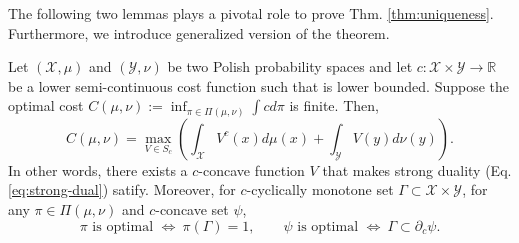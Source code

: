 The following two lemmas plays a pivotal role to prove Thm. \ref{thm:uniqueness}. Furthermore, we introduce generalized version of the theorem.
\begin{lemma} \label{lemma1}
Let $(\mathcal{X}, \mu)$ and $(\mathcal{Y}, \nu)$ be two Polish probability spaces and let $c:\mathcal{X}\times \mathcal{Y}\rightarrow \mathbb{R}$ be a lower semi-continuous cost function such that is lower bounded. Suppose the optimal cost $C(\mu, \nu) := \inf_{\pi \in \Pi(\mu, \nu)} \int c d\pi$ is finite. Then,
\begin{equation} \label{eq:strong-dual}
    C(\mu, \nu) = \max_{V\in S_c} \left( \int_{\mathcal{X}} V^c(x) d\mu(x) + \int_{\mathcal{Y}} V(y) d\nu(y) \right).
\end{equation}
In other words, there exists a $c$-concave function $V$ that makes strong duality (Eq. \ref{eq:strong-dual}) satify. Moreover, for $c$-cyclically monotone set $\Gamma \subset \mathcal{X}\times \mathcal{Y}$, for any $\pi\in \Pi(\mu, \nu)$ and $c$-concave set $\psi$,
\begin{equation}
    \pi \text{ is optimal } \Leftrightarrow \ \pi(\Gamma) = 1, \qquad \psi \text{ is optimal } \Leftrightarrow \ \Gamma \subset \partial_c \psi.
\end{equation}
\end{lemma}


